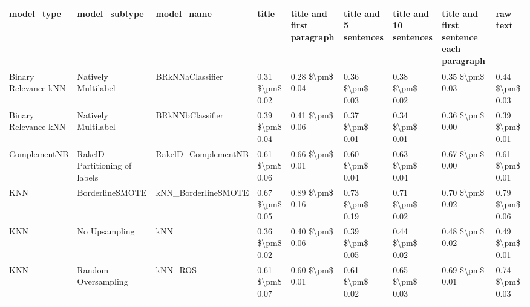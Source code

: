 \begin{tabular}{lllllllll}
\toprule
                     model\_type &                 model\_subtype &                                   model\_name &           title & title and first paragraph & title and 5 sentences & title and 10 sentences & title and first sentence each paragraph &        raw text \\
\midrule
           Binary Relevance kNN &           Natively Multilabel &                             BRkNNaClassifier & 0.31 \$\textbackslash pm\$ 0.02 &           0.28 \$\textbackslash pm\$ 0.04 &       0.36 \$\textbackslash pm\$ 0.03 &        0.38 \$\textbackslash pm\$ 0.02 &                         0.35 \$\textbackslash pm\$ 0.03 & 0.44 \$\textbackslash pm\$ 0.03 \\
           Binary Relevance kNN &           Natively Multilabel &                             BRkNNbClassifier & 0.39 \$\textbackslash pm\$ 0.04 &           0.41 \$\textbackslash pm\$ 0.06 &       0.37 \$\textbackslash pm\$ 0.01 &        0.34 \$\textbackslash pm\$ 0.01 &                         0.36 \$\textbackslash pm\$ 0.00 & 0.39 \$\textbackslash pm\$ 0.01 \\
                   ComplementNB & RakelD Partitioning of labels &                          RakelD\_ComplementNB & 0.61 \$\textbackslash pm\$ 0.06 &           0.66 \$\textbackslash pm\$ 0.01 &       0.60 \$\textbackslash pm\$ 0.04 &        0.63 \$\textbackslash pm\$ 0.04 &                         0.67 \$\textbackslash pm\$ 0.00 & 0.61 \$\textbackslash pm\$ 0.01 \\
                            KNN &               BorderlineSMOTE &                          kNN\_BorderlineSMOTE & 0.67 \$\textbackslash pm\$ 0.05 &           0.89 \$\textbackslash pm\$ 0.16 &       0.73 \$\textbackslash pm\$ 0.19 &        0.71 \$\textbackslash pm\$ 0.02 &                         0.70 \$\textbackslash pm\$ 0.02 & 0.79 \$\textbackslash pm\$ 0.06 \\
                            KNN &                 No Upsampling &                                          kNN & 0.36 \$\textbackslash pm\$ 0.02 &           0.40 \$\textbackslash pm\$ 0.06 &       0.39 \$\textbackslash pm\$ 0.05 &        0.44 \$\textbackslash pm\$ 0.02 &                         0.48 \$\textbackslash pm\$ 0.02 & 0.49 \$\textbackslash pm\$ 0.01 \\
                            KNN &           Random Oversampling &                                      kNN\_ROS & 0.61 \$\textbackslash pm\$ 0.07 &           0.60 \$\textbackslash pm\$ 0.01 &       0.61 \$\textbackslash pm\$ 0.02 &        0.65 \$\textbackslash pm\$ 0.03 &                         0.69 \$\textbackslash pm\$ 0.01 & 0.74 \$\textbackslash pm\$ 0.03 \\

\end{tabular}
